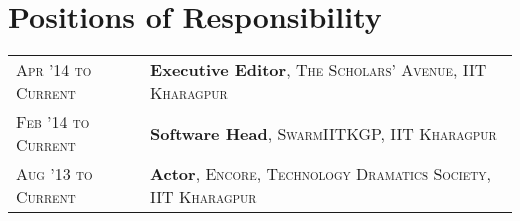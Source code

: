 \documentclass[a4paper,10pt]{extarticle} %
\begin{document}

\section{Positions of Responsibility}

\begin{tabular}{R{3.0cm}|p{15.0cm}}
\textsc{Apr '14 to Current} & \textbf{Executive Editor}, \textsc{The Scholars' Avenue, IIT Kharagpur}\\
\textsc{Feb '14 to Current} & \textbf{Software Head}, \textsc{SwarmIITKGP, IIT Kharagpur} \\
\textsc{Aug '13 to Current} & \textbf{Actor}, \textsc{Encore, Technology Dramatics Society, IIT Kharagpur} \\
\end{tabular}


\end{document}
